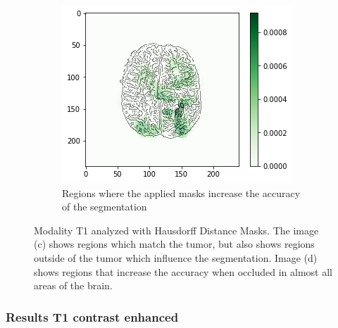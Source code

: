 \begin{figure}[H]
\begin{subfigure}[t]{.45\textwidth}
    \end{subfigure}\hspace{1cm}%
    \begin{subfigure}[t]{.45\textwidth}
        \centering
        \includegraphics[width=\linewidth]{chapters/06_hdm/b_Brats18_TCIA08_242_1_L2/24.png}
        \caption{Regions where the applied masks increase the accuracy of the segmentation}
    \end{subfigure}
    \caption{Modality T1 analyzed with Hausdorff Distance Masks. The image (c) shows regions which match the tumor, but also shows regions outside of the tumor which influence the segmentation. Image (d) shows regions that increase the accuracy when occluded in almost all areas of the brain.}
    \label{brats_tcia08_t1}
\end{figure}

\subsubsection{Results T1 contrast enhanced}

